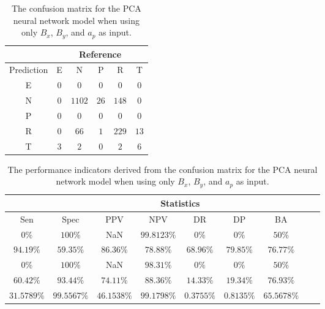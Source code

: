 \begin{table}[!ht]
	\centering
	\begin{tabular}{|c|c|c|c|c|c|}
		\hline
		 & \multicolumn{5}{|c|}{Reference} \\ \hline
		 Prediction & E & N & P & R & T \\ \hline
		 E & $0$ & $0$ & $0$ & $0$ & $0$ \\ \hline
		 N & $0$ & $1102$ & $26$ & $148$ & $0$ \\ \hline
		 P & $0$ & $0$ & $0$ & $0$ & $0$ \\ \hline
		 R & $0$ & $66$ & $1$ & $229$ & $13$ \\ \hline
		 T & $3$ & $2$ & $0$ & $2$ & $6$ \\ \hline
	\end{tabular}
	\caption{The confusion matrix for the PCA neural network model when using only $B_{x}$, $B_{y}$, and $a_{p}$ as input.}
	\label{tab:cm:xyap:pcaNNet}
\end{table}

\begin{table}[!ht]
	\centering
	\begin{tabular}{|c|c|c|c|c|c|c|c|c|}
		\hline
		 & \multicolumn{7}{c|}{Statistics} \\ \hline
		Sen & Spec & PPV & NPV & DR & DP & BA \\ \hline
		$0\%$ & $100\%$ & NaN & $99.8123\%$ & $0\%$ & $0\%$ & $50\%$ \\ \hline
		$94.19\%$ & $59.35\%$ & $86.36\%$ & $78.88\%$ & $68.96\%$ & $79.85\%$ & $76.77\%$ \\ \hline
		$0\%$ & $100\%$ & NaN & $98.31\%$ & $0\%$ & $0\%$ & $50\%$ \\ \hline
		$60.42\%$ & $93.44\%$ & $74.11\%$ & $88.36\%$ & $14.33\%$ & $19.34\%$ & $76.93\%$ \\ \hline
		$31.5789\%$ & $99.5567\%$ & $46.1538\%$ & $99.1798\%$ & $0.3755\%$ & $0.8135\%$ & $65.5678\%$ \\ \hline
	\end{tabular}
	\caption{The performance indicators derived from the confusion matrix for the PCA neural network model when using only $B_{x}$, $B_{y}$, and $a_{p}$ as input.}
	\label{tab:cs:xyap:pcaNNet}
\end{table}

